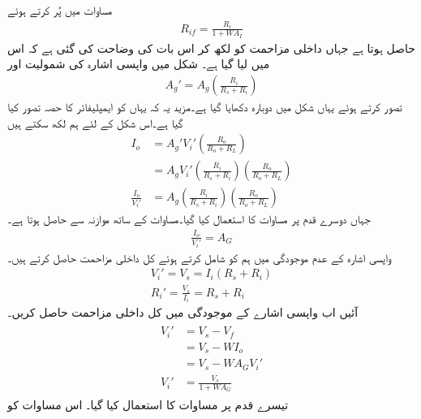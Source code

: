 مساوات  میں  پُر کرتے ہوئے
\begin{align}
R_{if}=\frac{ R_i}{1+W A_I}
\end{align}
حاصل ہوتا ہے جہاں داخلی مزاحمت کو  لکھ کر اس بات کی وضاحت کی گئی ہے کہ اس میں  لیا گیا ہے۔
شکل  میں واپسی اشارہ  کی شمولیت اور
\begin{align} \label{مساوات_واپسی_موصلیت_نما_افزائش_بمع_اشارہ_مزاحمت}
A_g' = A_g \left( \frac{R_i}{R_s+R_i} \right )
\end{align}
تصور کرتے ہوئے یہاں شکل  میں دوبارہ دکھایا گیا ہے۔مزید یہ کہ یہاں  کو ایمپلیفائر کا حصہ تصور کیا گیا ہے۔اس شکل کے لئے ہم لکھ سکتے ہیں
\begin{align*}
I_o&=A_g' V_i' \left (\frac{R_o}{R_o+R_L} \right ) \\
&=A_g V_i' \left (\frac{R_i}{R_s+R_i} \right ) \left (\frac{R_o}{R_o+R_L} \right ) \\
\frac{I_o}{V_i'}&=A_g \left (\frac{R_i}{R_s+R_i} \right ) \left (\frac{R_o}{R_o+R_L} \right )
\end{align*}
جہاں دوسرے قدم پر مساوات   کا استعمال کیا گیا۔مساوات  کے ساتھ موازنہ سے حاصل ہوتا ہے۔
\begin{align} \label{مساوات_واپسی_موصلیت_نما_افزائش_ب}
\frac{I_o}{V_i'}=A_G
\end{align}
واپسی اشارہ  کے عدم موجودگی میں ہم  کو شامل کرتے ہوئے کل داخلی مزاحمت  حاصل کرتے ہیں۔
\begin{align*}
V_i'=V_s =I_i \left(R_s+R_i \right) \\
R_i'=\frac{V_s}{I_i}=R_s+R_i
\end{align*}
آئیں اب واپسی اشارے کے موجودگی میں کل داخلی مزاحمت  حاصل کریں۔ 
\begin{gather} \label{مساوات_واپسی_داخلی_دباو_بالمقابل_اشارہ}
\begin{aligned}
V_i' &=V_s-V_f \\
&=V_s-W I_o \\
&=V_s-W A_G V_i'\\
V_i'&=\frac{V_s}{1+W A_G}
\end{aligned}
\end{gather}
تیسرے قدم پر مساوات  کا استعمال کیا گیا۔ اس مساوات کو 
